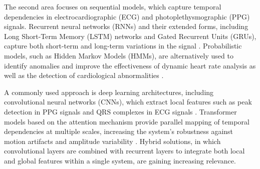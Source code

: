 \documentclass[journal]{IEEEtran}
\begin{document}
The second area focuses on sequential models, which capture temporal dependencies in electrocardiographic (ECG) and photoplethysmographic (PPG) signals. Recurrent neural networks (RNNs) and their extended forms, including Long Short-Term Memory (LSTM) networks and Gated Recurrent Units (GRUs), capture both short-term and long-term variations in the signal \cite{12}. Probabilistic models, such as Hidden Markov Models (HMMs), are alternatively used to identify anomalies and improve the effectiveness of dynamic heart rate analysis as well as the detection of cardiological abnormalities \cite{13}.

\newpage
A commonly used approach is deep learning architectures, including convolutional neural networks (CNNs), which extract local features such as peak detection in PPG signals and QRS complexes in ECG signals \cite{14}. Transformer models based on the attention mechanism provide parallel mapping of temporal dependencies at multiple scales, increasing the system's robustness against motion artifacts and amplitude variability \cite{15}. Hybrid solutions, in which convolutional layers are combined with recurrent layers to integrate both local and global features within a single system, are gaining increasing relevance.
\end{document}
